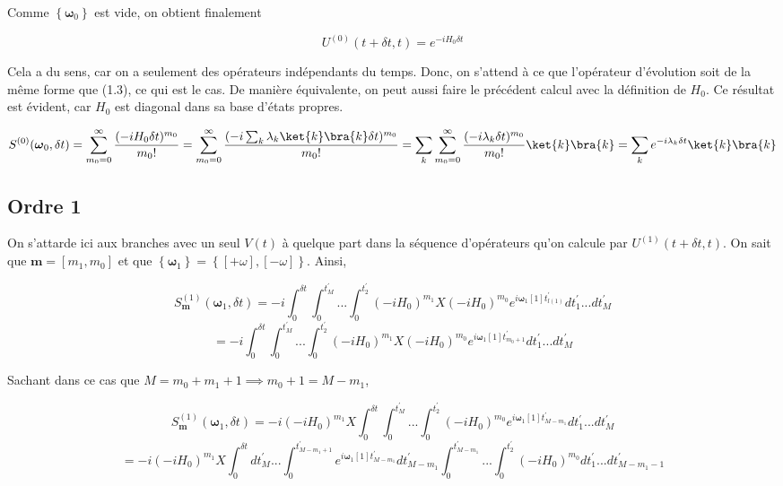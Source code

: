 Comme $\left\{\boldsymbol{\omega}_0\right\}$ est vide, on obtient finalement

\begin{equation*}
    U^{(0)}(t+\delta t, t) = e^{-iH_0\delta t}
\end{equation*}

Cela a du sens, car on a seulement des opérateurs indépendants du temps. Donc, on s'attend à ce que l'opérateur d'évolution soit de la même forme que (1.3), ce qui est le cas. De manière équivalente, on peut aussi faire le précédent calcul avec la définition de $H_0$. Ce résultat est évident, car $H_0$ est diagonal dans sa base d'états propres.

\begin{equation*}
    S^{(0)}(\boldsymbol{\omega}_0, \delta t) = \sum_{m_0 = 0}^{\infty}\frac{(-iH_0\delta t)^{m_0}}{m_0!} = \sum_{m_0 = 0}^{\infty}\frac{(-i\sum_{k}\lambda_k \ket{k}\bra{k}\delta t)^{m_0}}{m_0!} = \sum_{k}\sum_{m_0 = 0}^{\infty}\frac{(-i\lambda_k\delta t)^{m_0}}{m_0!}\ket{k}\bra{k} = \sum_{k}e^{-i\lambda_k\delta t}\ket{k}\bra{k}
\end{equation*}


\subsection{Ordre 1}
On s'attarde ici aux branches avec un seul $V(t)$ à quelque part dans la séquence d'opérateurs qu'on calcule par $ U^{(1)}(t+\delta t, t)$. On sait que $\boldsymbol{m} = [m_1, m_0]$ et que $\left\{\boldsymbol{\omega}_1\right\} = \left\{[+\omega], [-\omega]\right\}$. Ainsi, 

\begin{equation*}
    S^{(1)}_{\boldsymbol{m}}(\boldsymbol{\omega}_1, \delta t) = -i\int_{0}^{\delta t}\int_{0}^{t_M^{'}}... \int_{0}^{t_2^{'}}(-iH_0)^{m_1}X(-iH_0)^{m_0} e^{i\boldsymbol{\omega}_1[1]t^{'}_{l(1)}}dt_1^{'} ... dt_M^{'}
\end{equation*}
\begin{equation*}
    = -i\int_{0}^{\delta t}\int_{0}^{t_M^{'}}... \int_{0}^{t_2^{'}}(-iH_0)^{m_1}X(-iH_0)^{m_0} e^{i\boldsymbol{\omega}_1[1]t^{'}_{m_0+1}}dt_1^{'} ... dt_M^{'}
\end{equation*}

Sachant dans ce cas que $M = m_0 + m_1 + 1 \implies m_0 + 1 = M-m_1$,

\begin{equation*}
    S^{(1)}_{\boldsymbol{m}}(\boldsymbol{\omega}_1, \delta t) = -i (-iH_0)^{m_1}X
    \int_{0}^{\delta t}\int_{0}^{t_M^{'}}... \int_{0}^{t_2^{'}}(-iH_0)^{m_0} e^{i\boldsymbol{\omega}_1[1]t^{'}_{M-m_1}}dt_1^{'} ... dt_M^{'}
\end{equation*}
\begin{equation*}
    = -i (-iH_0)^{m_1}X
    \int_{0}^{\delta t}dt_M^{'} ... \int_{0}^{t^{'}_{M-m_1+1}}e^{i\boldsymbol{\omega}_1[1]t^{'}_{M-m_1}} dt_{M-m_1}^{'}\int_{0}^{t^{'}_{M-m_1}}... \int_{0}^{t_2^{'}}(-iH_0)^{m_0} dt_1^{'} ... dt_{M - m_1 - 1}^{'}
\end{equation*}


